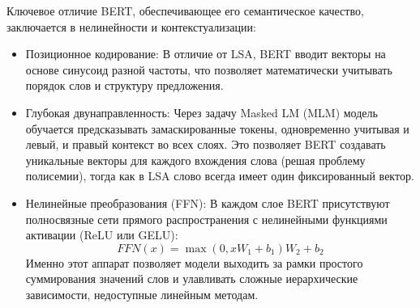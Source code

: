 \documentclass{article}
\begin{document}
Ключевое отличие BERT, обеспечивающее его семантическое качество, заключается в
нелинейности и контекстуализации:
\begin{itemize}
  \item Позиционное кодирование: В отличие от LSA, BERT вводит векторы на основе
    синусоид разной частоты, что позволяет математически учитывать
    порядок слов и
    структуру предложения.

  \item Глубокая двунаправленность: Через задачу Masked LM (MLM)
    модель обучается
    предсказывать замаскированные токены, одновременно учитывая и
    левый, и правый
    контекст во всех слоях. Это позволяет BERT создавать уникальные векторы для
    каждого вхождения слова (решая проблему полисемии), тогда как в LSA слово
    всегда имеет один фиксированный вектор.

  \item Нелинейные преобразования (FFN): В каждом слое BERT присутствуют
    полносвязные сети прямого распространения с нелинейными функциями активации
    (ReLU или GELU):
    \[
      FFN(x) = \max(0, xW_1 + b_1)W_2 + b_2
    \]
    Именно этот аппарат позволяет модели выходить за рамки простого суммирования
    значений слов и улавливать сложные иерархические зависимости, недоступные
    линейным методам.
\end{itemize}
\end{document}
